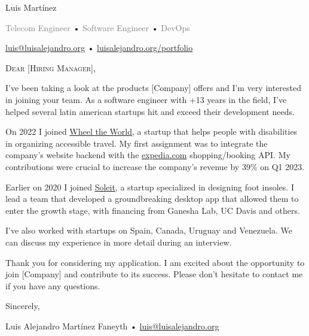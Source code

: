 \documentclass[12pt]{article}
\begin{document}
  \centering
\begin{cv}{Luis Mart\'inez}
  
  \vspace{0.25em}
  \textcolor{gray}{Telecom Engineer} •
  \textcolor{gray}{Software Engineer} •
  \textcolor{gray}{DevOps}

  \vspace{0.125em}
  \href{mailto:luis@luisalejandro.org}{luis@luisalejandro.org} •
  \href{https://luisalejandro.org/portfolio}{luisalejandro.org/portfolio}
  \vspace{0.125em}

    \hrulefill

    \begin{minipage}[t]{0.75\textwidth}
      \vspace{4em}

      \textrm{\textsc{\Large{Dear [Hiring Manager],}}}
      \vspace{2em}
      \newline
      \parbox[t]{\linewidth}{
        \linespread{1.5}\selectfont
          I've been taking a look at the products [Company] offers and I'm very interested in joining your team. As a software engineer with +13 years in the field, I've helped several latin american startups hit and exceed their development needs.
          \newline

          On 2022 I joined \href{https://wheeltheworld.com}{Wheel the World}, a startup that helps people with disabilities in organizing accessible travel. My first assignment was to integrate the company's website backend with the \href{https://expedia.com}{expedia.com} shopping/booking API. My contributions were crucial to increase the company's revenue by 39\% on Q1 2023.
          \newline

          Earlier on 2020 I joined \href{https://soleit.app/es/inicio}{Soleit}, a startup specialized in designing foot insoles. I lead a team that developed a groundbreaking desktop app that allowed them to enter the growth stage, with financing from Ganesha Lab, UC Davis and others.
          \newline

          I've also worked with startups on Spain, Canada, Uruguay and Venezuela. We can discuss my experience in more detail during an interview.
          \newline

          Thank you for considering my application. I am excited about the opportunity to join [Company] and contribute to its success. Please don't hesitate to contact me if you have any questions.
          \newline

          Sincerely,
      }
      \vspace{0.125em}
      \parbox[t]{\linewidth}{
        \centering
        \vspace{4em}
        Luis Alejandro Mart\'inez Faneyth • \href{mailto:luis@luisalejandro.org}{luis@luisalejandro.org}
      }
    \end{minipage}

  \end{cv}
\end{document}
